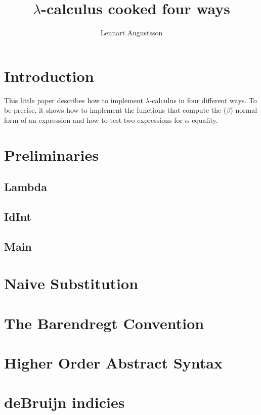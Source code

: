 \documentclass{article}
\date{}
\title{
$\lambda$-calculus cooked four ways
}
\author{
Lennart Augustsson
}
\begin{document}
\maketitle


\section{Introduction}
This little paper describes how to implement $\lambda$-calculus in
four different ways.  To be precise, it shows how to implement the
functions that compute the ($\beta$) normal form of an expression
and how to test two expressions for $\alpha$-equality.

\section{Preliminaries}
\subsection{Lambda}

\subsection{IdInt}

\subsection{Main}


\section{Naive Substitution}


\section{The Barendregt Convention}


\section{Higher Order Abstract Syntax}


\section{deBruijn indicies}

\end{document}
